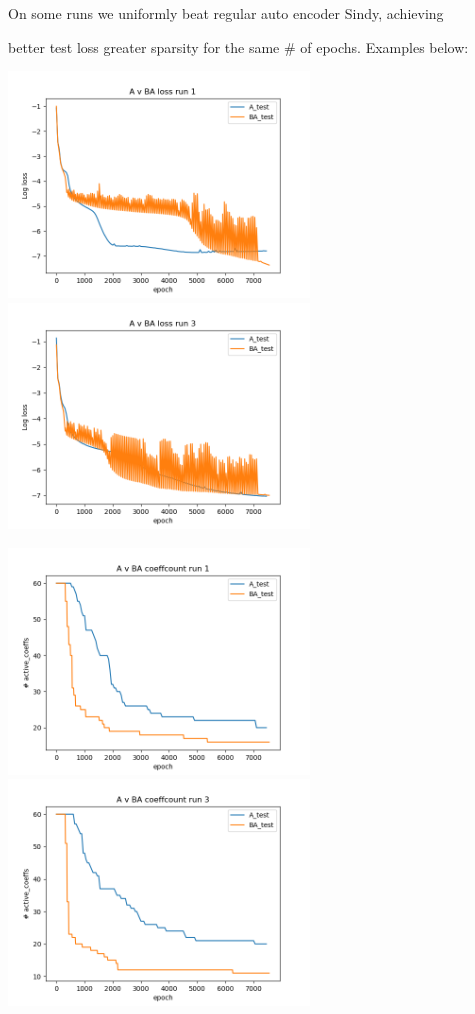 \documentclass[11pt]{article}
\begin{document}
\pagebreak

On some runs we uniformly beat regular auto encoder Sindy,  achieving 

better test loss greater sparsity for the same \# of epochs. Examples below:


\includegraphics[width=80mm]{run1_loss.png}
\includegraphics[width=80mm]{run3_loss.png}

\includegraphics[width=80mm]{run1_coeffs.png}
\includegraphics[width=80mm]{run3_coeffs.png}




   
\end{document}
